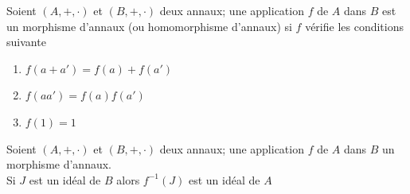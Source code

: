 \begin{definition}
    Soient $(A,+,\cdot)$ et $(B,+,\cdot)$ deux annaux; une application $f$ de $A$ dans $B$ est un morphisme d'annaux (ou homomorphisme d'annaux) si $f$ vérifie les conditions suivante
    \begin{enumerate}
        \item $f(a+a')=f(a)+f(a')$
        \item $f(aa')=f(a)f(a')$
        \item $ f(1)=1$
    \end{enumerate}
\end{definition}
\begin{proposition}
    Soient $(A,+,\cdot)$ et $(B,+,\cdot)$ deux annaux; une application $f$ de $A$ dans $B$ un morphisme d'annaux.\\
    Si $J$ est un idéal de $B$ alors $f^{-1}(J)$ est un idéal de $A$
\end{proposition}
